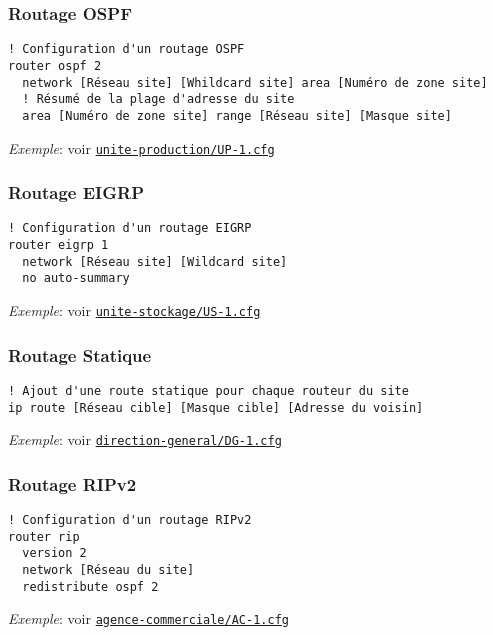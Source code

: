 \documentclass{article}
\newcommand{\seefile}[1]{
  \begin{center}
  \begin{minipage}{0.9\textwidth}
    \emph{Exemple}: voir \texttt{\href{https://github.com/EpicKiwi/Wide-Network-Project-Cesi-A4/blob/master/network/#1}{#1}}
  \end{minipage}
  \end{center}
}
\begin{document}
\subsubsection{Routage OSPF}

\begin{lstlisting}[caption=Configuration d'un routeur de site avec OSPF]
! Configuration d'un routage OSPF
router ospf 2
  network [Réseau site] [Whildcard site] area [Numéro de zone site]
  ! Résumé de la plage d'adresse du site
  area [Numéro de zone site] range [Réseau site] [Masque site]
\end{lstlisting}

\seefile{unite-production/UP-1.cfg}

\subsubsection{Routage EIGRP}

\begin{lstlisting}[caption=Configuration d'un routeur de site avec EIGRP]
! Configuration d'un routage EIGRP
router eigrp 1
  network [Réseau site] [Wildcard site]
  no auto-summary
\end{lstlisting}

\seefile{unite-stockage/US-1.cfg}

\subsubsection{Routage Statique}

\begin{lstlisting}[caption=Configuration d'un routeur de site avec routage statique]
! Ajout d'une route statique pour chaque routeur du site
ip route [Réseau cible] [Masque cible] [Adresse du voisin]
\end{lstlisting}

\seefile{direction-general/DG-1.cfg}

\subsubsection{Routage RIPv2}

\begin{lstlisting}[caption=Configuration d'un routeur de site avec RIPv2]
! Configuration d'un routage RIPv2
router rip
  version 2
  network [Réseau du site]
  redistribute ospf 2
\end{lstlisting}

\seefile{agence-commerciale/AC-1.cfg}
\end{document}

